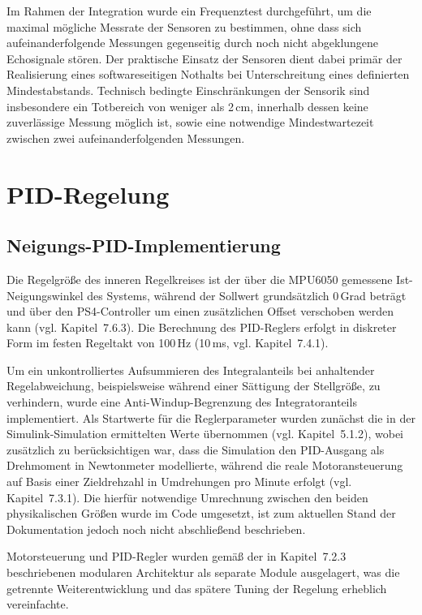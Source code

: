 \documentclass[12pt,ngerman,numbers=noenddot,abstracton,headsepline]{scrreprt}
\begin{document}
Im Rahmen der Integration wurde ein Frequenztest durchgeführt, um die maximal mögliche Messrate der Sensoren zu bestimmen, ohne dass sich aufeinanderfolgende Messungen gegenseitig durch noch nicht abgeklungene Echosignale stören. Der praktische Einsatz der Sensoren dient dabei primär der Realisierung eines softwareseitigen Nothalts bei Unterschreitung eines definierten Mindestabstands. Technisch bedingte Einschränkungen der Sensorik sind insbesondere ein Totbereich von weniger als 2\,cm, innerhalb dessen keine zuverlässige Messung möglich ist, sowie eine notwendige Mindestwartezeit zwischen zwei aufeinanderfolgenden Messungen.

\section{PID-Regelung}
\label{sec:pid_regelung}

\subsection{Neigungs-PID-Implementierung}
\label{subsec:neigungs_pid_impl}

Die Regelgröße des inneren Regelkreises ist der über die MPU6050 gemessene Ist-Neigungswinkel des Systems, während der Sollwert grundsätzlich 0\,Grad beträgt und über den PS4-Controller um einen zusätzlichen Offset verschoben werden kann (vgl. Kapitel~7.6.3). Die Berechnung des PID-Reglers erfolgt in diskreter Form im festen Regeltakt von 100\,Hz (10\,ms, vgl. Kapitel~7.4.1).

Um ein unkontrolliertes Aufsummieren des Integralanteils bei anhaltender Regelabweichung, beispielsweise während einer Sättigung der Stellgröße, zu verhindern, wurde eine Anti-Windup-Begrenzung des Integratoranteils implementiert. Als Startwerte für die Reglerparameter wurden zunächst die in der Simulink-Simulation ermittelten Werte übernommen (vgl. Kapitel~5.1.2), wobei zusätzlich zu berücksichtigen war, dass die Simulation den PID-Ausgang als Drehmoment in Newtonmeter modellierte, während die reale Motoransteuerung auf Basis einer Zieldrehzahl in Umdrehungen pro Minute erfolgt (vgl. Kapitel~7.3.1). Die hierfür notwendige Umrechnung zwischen den beiden physikalischen Größen wurde im Code umgesetzt, ist zum aktuellen Stand der Dokumentation jedoch noch nicht abschließend beschrieben. %

Motorsteuerung und PID-Regler wurden gemäß der in Kapitel~7.2.3 beschriebenen modularen Architektur als separate Module ausgelagert, was die getrennte Weiterentwicklung und das spätere Tuning der Regelung erheblich vereinfachte.
\end{document}
